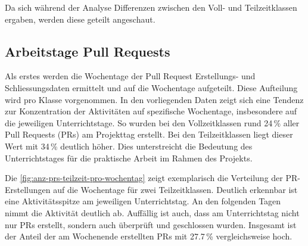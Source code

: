 Da sich während der Analyse  Differenzen zwischen den Voll- und Teilzeitklassen ergaben, werden diese geteilt angeschaut. 

\subsection{Arbeitstage Pull Requests}
Als erstes werden die Wochentage der Pull Request Erstellungs- und Schliessungsdaten ermittelt und auf die Wochentage aufgeteilt. Diese Aufteilung wird pro Klasse vorgenommen. In den vorliegenden Daten zeigt sich eine Tendenz zur Konzentration der Aktivitäten auf spezifische Wochentage, insbesondere auf die jeweiligen Unterrichtstage. So wurden bei den Vollzeitklassen rund 24\,\% aller Pull Requests (PRs) am Projekttag erstellt. Bei den Teilzeitklassen liegt dieser Wert mit 34\,\% deutlich höher. Dies unterstreicht die Bedeutung des Unterrichtstages für die praktische Arbeit im Rahmen des Projekts.

Die \autoref{fig:anz-prs-teilzeit-pro-wochentag} zeigt exemplarisch die Verteilung der PR-Erstellungen auf die Wochentage für zwei Teilzeitklassen. Deutlich erkennbar ist eine Aktivitätsspitze am jeweiligen Unterrichtstag. An den folgenden Tagen nimmt die Aktivität deutlich ab. Auffällig ist auch, dass am Unterrichtstag nicht nur PRs erstellt, sondern auch überprüft und geschlossen wurden. Insgesamt ist der Anteil der am Wochenende erstellten PRs mit 27.7\,\% vergleichsweise hoch.

